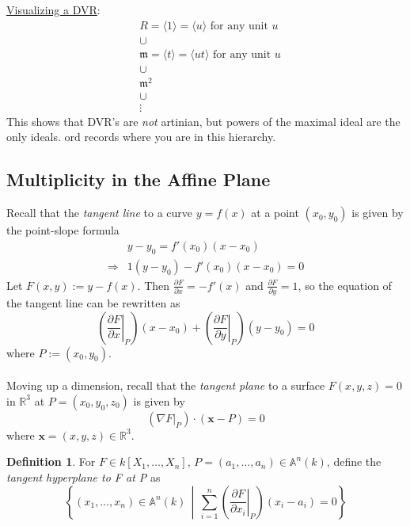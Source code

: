 \documentclass[12pt]{article}
\newcommand{\real}{\mathbb{R}}
\newcommand{\ita}[1]{\textit{#1}}
\newcommand{\vbrack}[1]{\langle #1\rangle}
\theoremstyle{definition}
\newtheorem{definition}[theorem]{Definition}
\begin{document}
\underline{Visualizing a DVR}:
\begin{align*}
    &R=\vbrack{1}=\vbrack{u}\text{ for any unit }u\\
    &\cup\\
    &\mathfrak{m}=\vbrack{t}=\vbrack{ut}\text{ for any unit }u\\
    &\cup\\
    &\mathfrak{m}^2\\
    &\cup\\
    &\vdots
\end{align*}
This shows that DVR's are \ita{not} artinian, but powers of the maximal ideal are the only ideals. $\mathrm{ord}$ records where you are in this hierarchy. 
\subsection{Multiplicity in the Affine Plane}
Recall that the \ita{tangent line} to a curve $y=f(x)$ at a point $(x_0,y_0)$ is given by the point-slope formula
\begin{equation*}
    \begin{split}
        &y-y_0=f'(x_0)(x-x_0)\\
        \Rightarrow&1(y-y_0)-f'(x_0)(x-x_0)=0
    \end{split}
\end{equation*}
Let $F(x,y):=y-f(x)$. Then $\frac{\partial F}{\partial x}=-f'(x)$ and $\frac{\partial F}{\partial y}=1$, so the equation of the tangent line can be rewritten as 
\begin{equation}
    \left(\left.\frac{\partial F}{\partial x}\right|_P\right)(x-x_0)+\left(\left.\frac{\partial F}{\partial y}\right|_P\right)(y-y_0)=0
\end{equation}
where $P:=(x_0,y_0)$.\\\\
Moving up a dimension, recall that the \ita{tangent plane} to a surface $F(x,y,z)=0$ in $\real^3$ at $P=(x_0,y_0,z_0)$ is given by 
\begin{equation}
    \left(\left.\nabla F\right|_P\right)\cdot(\mathbf{x}-P)=0
\end{equation}
where $\mathbf{x}=(x,y,z)\in\real^3$.
\begin{definition}
    For $F\in k[X_1,\dotsc,X_n]$, $P=(a_1,\dotsc,a_n)\in\mathbb{A}^n(k)$, define the \ita{tangent hyperplane to F at P} as
    \begin{equation}
        \left\{(x_1,\dotsc,x_n)\in\mathbb{A}^n(k)\,\middle|\,\sum\limits_{i=1}^n\left(\left.\frac{\partial F}{\partial x_i}\right|_P\right)(x_i-a_i)=0\right\}
    \end{equation}
\end{definition}
\end{document}
